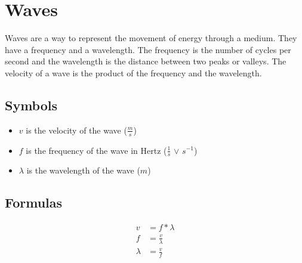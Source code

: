 \section{Waves}
Waves are a way to represent the movement of energy through a medium. They have a frequency and a wavelength. The frequency is the number of cycles per second and the wavelength is the distance between two peaks or valleys. The velocity of a wave is the product of the frequency and the wavelength.
\subsection{Symbols}
\begin{itemize}
    \item \(v\) is the velocity of the wave (\(\frac{m}{s}\))
    \item \(f\) is the frequency of the wave in Hertz (\(\frac{1}{s}\) $\lor$ \(s^{-1}\))
    \item \(\lambda\) is the wavelength of the wave (\(m\))
\end{itemize}
\subsection{Formulas}
\[
    \begin{aligned}
        v & = f * \lambda \\
        f & = \frac{v}{\lambda} \\
        \lambda & = \frac{v}{f}
    \end{aligned}
\]
